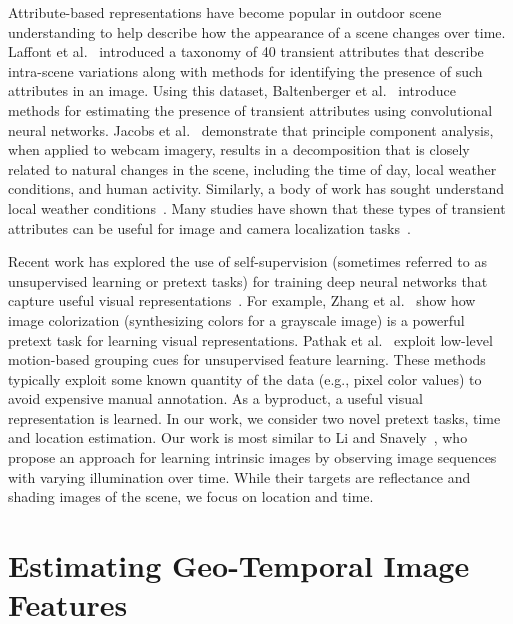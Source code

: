 \documentclass{bmvc2k}
\newcommand{\seclab}[1]{\label{sec:#1}}
\begin{document}
Attribute-based representations have become popular in outdoor scene
understanding to help describe how the appearance of a scene changes
over time. Laffont et al.~\cite{laffont2014transient} introduced a taxonomy
of 40 transient attributes that describe intra-scene variations along
with methods for identifying the presence of such attributes in an
image. Using this dataset, Baltenberger et
al.~\cite{baltenberger16transient} introduce methods for estimating
the presence of transient attributes using convolutional neural
networks. Jacobs et al.~\cite{jacobs07amos} demonstrate
that principle component analysis, when applied to webcam imagery,
results in a decomposition that is closely related to natural changes
in the scene, including the time of day, local weather conditions, and
human activity. Similarly, a body of work has sought understand local
weather conditions~\cite{islam13webcamweather,lu2014two}. Many studies
have shown that these types of transient attributes can be useful for
image and camera localization
tasks~\cite{jacobs07geolocate,baltenberger16transient}.

Recent work has explored the use of self-supervision (sometimes
referred to as unsupervised learning or pretext tasks) for training
deep neural networks that capture useful visual
representations~\cite{doersch2015unsupervised,pathak2016context}. For
example, Zhang et al.~\cite{zhang2016colorful} show how image
colorization (synthesizing colors for a grayscale image) is a powerful
pretext task for learning visual representations. Pathak et
al.~\cite{pathak2017learning} exploit low-level motion-based grouping
cues for unsupervised feature learning. These methods typically
exploit some known quantity of the data (e.g., pixel color values) to
avoid expensive manual annotation. As a byproduct, a useful visual
representation is learned. In our work, we consider two novel pretext
tasks, time and location estimation. Our work is most similar to Li
and Snavely~\cite{li2018learning}, who propose an approach for
learning intrinsic images by observing image sequences with varying
illumination over time. While their targets are reflectance and
shading images of the scene, we focus on location and time.


\section{Estimating Geo-Temporal Image Features}
\seclab{when-and-where}
\end{document}
